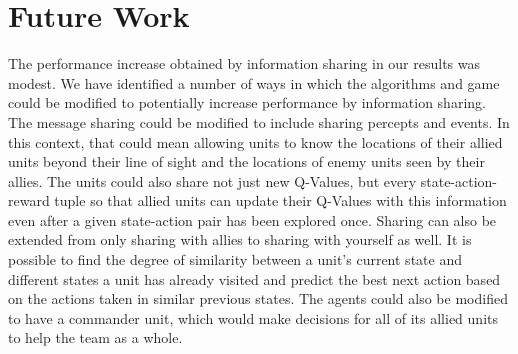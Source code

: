\section{Future Work} \label{futurework}


The performance increase obtained by information sharing in our results was modest. We have identified a number of ways in which the algorithms and game could be modified to potentially increase performance by information sharing. The message sharing could be modified to include sharing percepts and events. In this context, that could mean allowing units to know the locations of their allied units beyond their line of sight and the locations of enemy units seen by their allies. The units could also share not just new Q-Values, but every state-action-reward tuple so that allied units can update their Q-Values with this information even after a given state-action pair has been explored once. Sharing can also be extended from only sharing with allies to sharing with yourself as well. It is possible to find the degree of similarity between a unit's current state and different states a unit has already visited and predict the best next action based on the actions taken in similar previous states. The agents could also be modified to have a commander unit, which would make decisions for all of its allied units to help the team as a whole.
 \endinput
 
